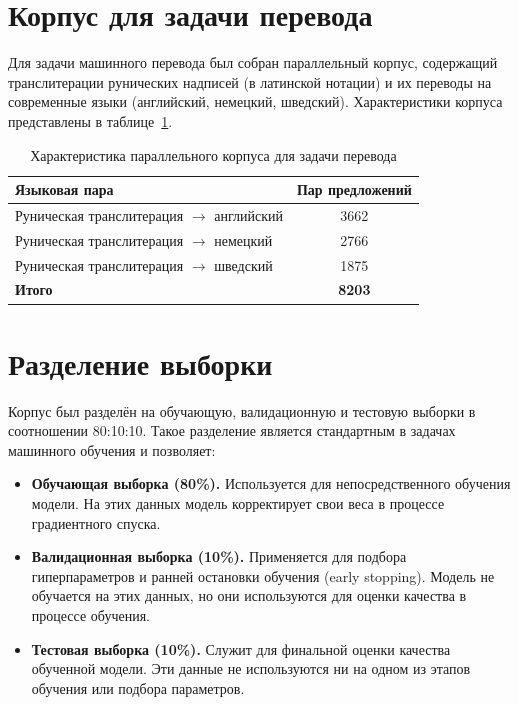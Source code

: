 \documentclass[14pt,a4paper]{extreport}
\begin{document}
\section{Корпус для задачи перевода}

Для задачи машинного перевода был собран параллельный корпус, содержащий транслитерации рунических надписей (в латинской нотации) и их переводы на современные языки (английский, немецкий, шведский). Характеристики корпуса представлены в таблице~\ref{tab:mt_data}.

\begin{table}[H]
\centering
\caption{Характеристика параллельного корпуса для задачи перевода}
\label{tab:mt_data}
\begin{tabular}{|l|c|}
\hline
\textbf{Языковая пара} & \textbf{Пар предложений}\\
\hline
Руническая транслитерация $\to$ английский & 3662 \\
\hline
Руническая транслитерация $\to$ немецкий & 2766 \\
\hline
Руническая транслитерация $\to$ шведский & 1875 \\
\hline
\textbf{Итого} & \textbf{8203} \\
\hline
\end{tabular}
\end{table}

\section{Разделение выборки}

Корпус был разделён на обучающую, валидационную и тестовую выборки в соотношении 80:10:10. Такое разделение является стандартным в задачах машинного обучения и позволяет:

\begin{itemize}
    \item \textbf{Обучающая выборка (80\%).} Используется для непосредственного обучения модели. На этих данных модель корректирует свои веса в процессе градиентного спуска.
    
    \item \textbf{Валидационная выборка (10\%).} Применяется для подбора гиперпараметров и ранней остановки обучения (early stopping). Модель не обучается на этих данных, но они используются для оценки качества в процессе обучения.
    
    \item \textbf{Тестовая выборка (10\%).} Служит для финальной оценки качества обученной модели. Эти данные не используются ни на одном из этапов обучения или подбора параметров.
\end{itemize}
\end{document}

